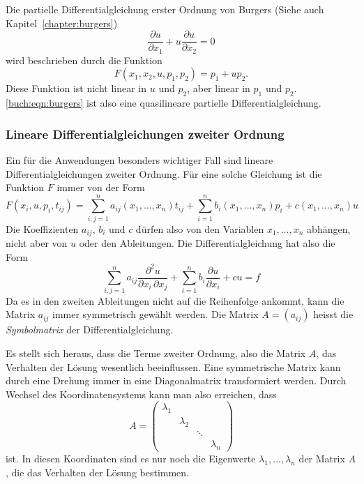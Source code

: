 \begin{beispiel}
Die partielle Differentialgleichung erster Ordnung von Burgers
(Siehe auch Kapitel~\ref{chapter:burgers})
%
%
\begin{equation}
\frac{\partial u}{\partial x_1}
+
u
\frac{\partial u}{\partial x_2}
=
0
\label{buch:eqn:burgers}
\end{equation}
wird beschrieben durch die Funktion
\[
F(x_1,x_2,u,p_1,p_2)
=
p_1+up_2.
\]
Diese Funktion ist nicht linear in $u$ und $p_2$, aber linear in
$p_1$ und $p_2$.
\eqref{buch:eqn:burgers} ist also eine quasilineare partielle
Differentialgleichung.
\end{beispiel}

\subsubsection{Lineare Differentialgleichungen zweiter Ordnung}
Ein für die Anwendungen besonders wichtiger Fall sind lineare
Differentialgleichungen zweiter Ordnung.
Für eine solche Gleichung ist die Funktion $F$ immer von der Form
\[
F(x_i,u,p_i,t_{ij})
=
\sum_{i,j=1}^n a_{ij}(x_1,\dots,x_n)t_{ij} + \sum_{i=1}^n b_i(x_1,\dots,x_n) p_i + c(x_1,\dots,x_n) u 
\]
Die Koeffizienten $a_{ij}$, $b_i$ und $c$ dürfen also von den Variablen
$x_1,\dots,x_n$ abhängen, nicht aber von $u$ oder den Ableitungen.
Die Differentialgleichung hat also die Form
\begin{equation}
\sum_{i,j=1}^n
a_{ij}\frac{\partial^2 u}{\partial x_i\,\partial x_j}
+
\sum_{i=1}^n
b_i\frac{\partial u}{\partial x_i}
+
cu
=
f
\label{pde:eqn:eqn2nd}
\end{equation}
Da es in den zweiten Ableitungen nicht auf die Reihenfolge ankommt,
kann die Matrix $a_{ij}$ immer symmetrisch gewählt werden.
Die Matrix $A=(a_{ij})$ heisst die {\em Symbolmatrix} der Differentialgleichung.
%

Es stellt sich heraus, dass die Terme zweiter Ordnung, also die 
Matrix $A$, das Verhalten der Lösung wesentlich beeinflussen.
Eine symmetrische Matrix kann durch eine Drehung immer in eine
Diagonalmatrix transformiert werden.
Durch Wechsel des Koordinatensystems kann man also erreichen, dass
\[
A
=
\begin{pmatrix}
\lambda_1&         &      &         \\
         &\lambda_2&      &         \\
         &         &\ddots&         \\
         &         &      &\lambda_n
\end{pmatrix}
\]
ist.
In diesen Koordinaten sind es nur noch die Eigenwerte
$\lambda_1,\dots,\lambda_n$ der Matrix $A$, die das Verhalten der Lösung
bestimmen.

